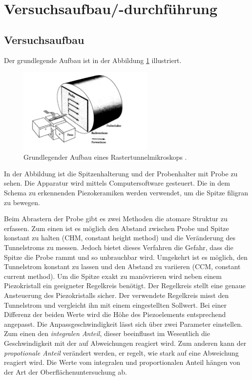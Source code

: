 \section{Versuchsaufbau/-durchführung}

\subsection{Versuchsaufbau}
Der grundlegende Aufbau ist in der Abbildung \ref{fig: aufbau} illustriert.
\begin{figure}[!h]
  \centering
  \includegraphics[width=0.6\textwidth]{./pics/aufbau.png}
  \caption{Grundlegender Aufbau eines Rastertunnelmikroskops \cite{anleitung_frankfurt}.}
  \label{fig: aufbau}
\end{figure}
In der Abbildung ist die Spitzenhalterung und
der Probenhalter mit Probe zu sehen. Die Apparatur wird mittels Computersoftware gesteuert.
Die in dem Schema zu erkennenden Piezokeramiken werden
verwendet, um die Spitze filigran zu bewegen. %

Beim Abrastern der Probe gibt es zwei Methoden die atomare Struktur zu erfassen.
Zum einen ist es möglich den Abstand zwischen Probe und Spitze konstant zu halten (CHM, constant height method)
und die Veränderung des Tunnelstroms zu messen. %
Jedoch bietet dieses Verfahren die Gefahr, dass die Spitze die Probe rammt und so unbrauchbar wird.
Umgekehrt ist es möglich, den Tunnelstrom konstant zu lassen und den Abstand zu variieren (CCM, constant current method).
Um die Spitze exakt zu manövrieren wird neben einem Piezokristall ein geeigneter Regelkreis benötigt. %
Der Regelkreis stellt eine genaue Ansteuerung des Piezokristalls sicher.
Der verwendete Regelkreis misst den Tunnelstrom und vergleicht ihn mit einem
eingestellten Sollwert. Bei einer Differenz der beiden Werte wird die Höhe des Piezoelements
entsprechend angepasst. Die Anpassgeschwindigkeit lässt sich über zwei Parameter
einstellen. Zum einen den \emph{integralen Anteil}, dieser beeinflusst im Wesentlich die %
Geschwindigkeit mit der auf Abweichungen reagiert wird. Zum anderen kann der %
\emph{propotionale Anteil} verändert werden,
er regelt, wie stark auf eine Abweichung reagiert wird.
Die Werte vom integralen und proportionalen Anteil hängen von der Art der
Oberflächenuntersuchung ab.

